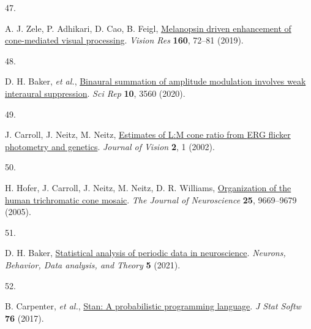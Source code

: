 \documentclass[
]{article}
\newlength{\cslhangindent}
\newlength{\csllabelwidth}
\newlength{\cslentryspacingunit} %
\newenvironment{CSLReferences}[2] %
 {%
  \setlength{\parindent}{0pt}
  \ifodd #1
  \let\oldpar\par
  \def\par{\hangindent=\cslhangindent\oldpar}
  \fi
  \setlength{\parskip}{#2\cslentryspacingunit}
 }%
 {}
\newcommand{\CSLLeftMargin}[1]{\parbox[t]{\csllabelwidth}{#1}}
\newcommand{\CSLRightInline}[1]{\parbox[t]{\linewidth - \csllabelwidth}{#1}\break}
\begin{document}
\begin{CSLReferences}{0}{0}
\leavevmode{}%
\CSLLeftMargin{47. }%
\CSLRightInline{A. J. Zele, P. Adhikari, D. Cao, B. Feigl, \href{https://doi.org/10.1016/j.visres.2019.04.009}{Melanopsin driven enhancement of cone-mediated visual processing}. \emph{Vision Res} \textbf{160}, 72--81 (2019).}

\leavevmode{}%
\CSLLeftMargin{48. }%
\CSLRightInline{D. H. Baker, \emph{et al.}, \href{https://doi.org/10.1038/s41598-020-60602-5}{Binaural summation of amplitude modulation involves weak interaural suppression}. \emph{Sci Rep} \textbf{10}, 3560 (2020).}

\leavevmode{}%
\CSLLeftMargin{49. }%
\CSLRightInline{J. Carroll, J. Neitz, M. Neitz, \href{https://doi.org/10.1167/2.8.1}{Estimates of {L}:{M} cone ratio from {ERG} flicker photometry and genetics}. \emph{Journal of Vision} \textbf{2}, 1 (2002).}

\leavevmode{}%
\CSLLeftMargin{50. }%
\CSLRightInline{H. Hofer, J. Carroll, J. Neitz, M. Neitz, D. R. Williams, \href{https://doi.org/10.1523/jneurosci.2414-05.2005}{Organization of the human trichromatic cone mosaic}. \emph{The Journal of Neuroscience} \textbf{25}, 9669--9679 (2005).}

\leavevmode{}%
\CSLLeftMargin{51. }%
\CSLRightInline{D. H. Baker, \href{https://doi.org/10.51628/001c.27680}{Statistical analysis of periodic data in neuroscience}. \emph{Neurons, Behavior, Data analysis, and Theory} \textbf{5} (2021).}

\leavevmode{}%
\CSLLeftMargin{52. }%
\CSLRightInline{B. Carpenter, \emph{et al.}, \href{https://doi.org/10.18637/jss.v076.i01}{Stan: A probabilistic programming language}. \emph{J Stat Softw} \textbf{76} (2017).}

\end{CSLReferences}
\end{document}
